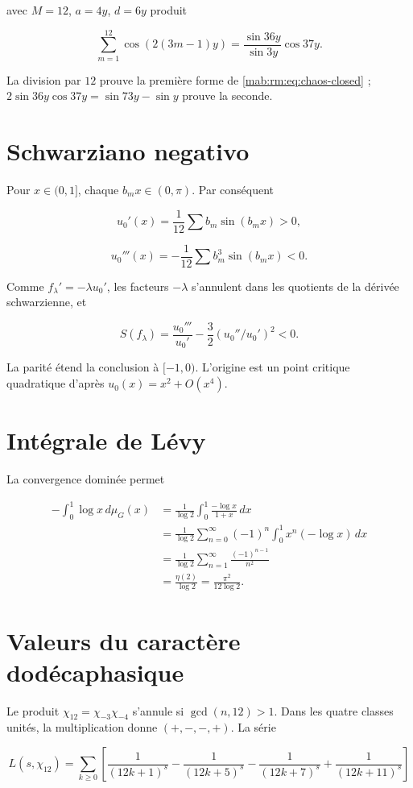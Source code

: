 avec \(M=12\), \(a=4y\), \(d=6y\) produit

\[
\sum_{m=1}^{12}\cos(2(3m-1)y)
=\frac{\sin36y}{\sin3y}\cos37y.
\]

La division par \(12\) prouve la première forme de \cref{mab:rm:eq:chaos-closed} ; \(2\sin36y\cos37y=\sin73y-\sin y\) prouve la seconde.

\section{Schwarziano negativo}

Pour \(x\in(0,1]\), chaque \(b_mx\in(0,\pi)\). Par conséquent

\[
u_0'(x)=\frac1{12}\sum b_m\sin(b_mx)>0,
\]

\[
u_0'''(x)=-\frac1{12}\sum b_m^3\sin(b_mx)<0.
\]

Comme \(f_\lambda'=-\lambda u_0'\), les facteurs \(-\lambda\) s’annulent dans les quotients de la dérivée schwarzienne, et

\[
S(f_\lambda)=\frac{u_0'''}{u_0'}
-\frac32(u_0''/u_0')^2<0.
\]

La parité étend la conclusion à \([-1,0)\). L’origine est un point critique quadratique d’après \(u_0(x)=x^2+O(x^4)\).

\section{Intégrale de Lévy}

La convergence dominée permet

\begin{align*}
-\int_0^1\log x\,d\mu_G(x)
&=\frac1{\log2}\int_0^1\frac{-\log x}{1+x}\,dx\\
&=\frac1{\log2}\sum_{n=0}^\infty(-1)^n
\int_0^1x^n(-\log x)\,dx\\
&=\frac1{\log2}\sum_{n=1}^\infty\frac{(-1)^{n-1}}{n^2}\\
&=\frac{\eta(2)}{\log2}
=\frac{\pi^2}{12\log2}.
\end{align*}

\section{Valeurs du caractère dodécaphasique}

Le produit \(\chi_{12}=\chi_{-3}\chi_{-4}\) s’annule si \(\gcd(n,12)>1\). Dans les quatre classes unités, la multiplication donne \((+,-,-,+)\). La série

\[
L(s,\chi_{12})=
\sum_{k\ge0}\left[
\frac1{(12k+1)^s}-\frac1{(12k+5)^s}
-\frac1{(12k+7)^s}+\frac1{(12k+11)^s}
\right]
\]

